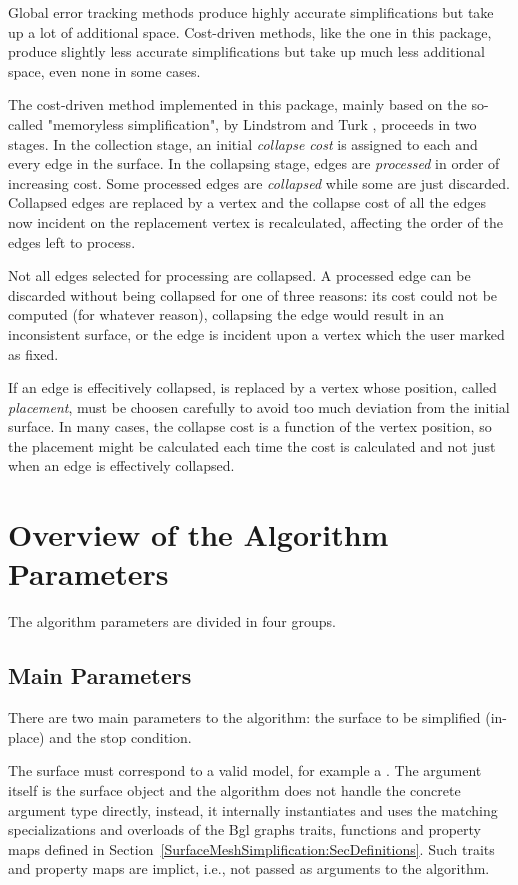 Global error tracking methods produce highly accurate simplifications but take up a lot of additional space. Cost-driven methods, like the one in this package, produce slightly less accurate simplifications but take up much less additional space, even none in some cases.

The cost-driven method implemented in this package, mainly based on the so-called "memoryless simplification", by Lindstrom and Turk \cite{}, proceeds in two stages. In the collection stage, an initial {\em collapse cost} is assigned to each and every edge in the surface. In the collapsing stage, edges are {\em processed} in order of increasing cost. Some processed edges are {\em collapsed} while some are just discarded. Collapsed edges are replaced by a vertex and the collapse cost of all the edges now incident on the replacement vertex is recalculated, affecting the order of the edges left to process.

Not all edges selected for processing are collapsed. A processed edge can be discarded without being collapsed for one of three reasons: its cost could not be computed (for whatever reason), collapsing the edge would result in an inconsistent surface, or the edge is incident upon a vertex which the user marked as fixed.

If an edge is effecitively collapsed, is replaced by a vertex whose position, called {\em placement}, must be choosen carefully to avoid too much deviation from the initial surface. In many cases, the collapse cost is a function of the vertex position, so the placement might be calculated each time the cost is calculated and not just when an edge is effectively collapsed.

\section{Overview of the Algorithm Parameters}

The algorithm parameters are divided in four groups.

\subsection{Main Parameters}

There are two main parameters to the algorithm: the surface to be simplified (in-place) and the stop condition.

The surface must correspond to a valid  model, for example a . The argument itself is the surface object and the algorithm does not handle the concrete argument type directly, instead, it internally instantiates and uses the matching specializations and overloads of the {\sc Bgl} graphs traits, functions and property maps defined in Section~\ref{SurfaceMeshSimplification:SecDefinitions}. Such traits and property maps are implict, i.e., not passed as arguments to the algorithm.

